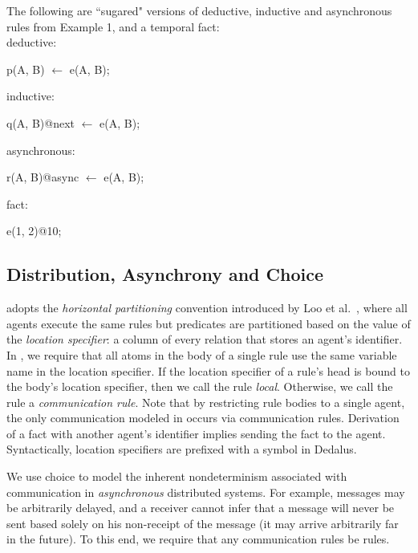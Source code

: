 \begin{example}
The following are ``sugared" versions of deductive, inductive and asynchronous rules from Example 1, and a temporal fact:
\\
deductive:
\begin{Dedalus}
p(A, B) \(\leftarrow\) e(A, B);
\end{Dedalus}
inductive:
\begin{Dedalus}
q(A, B)@next \(\leftarrow\) e(A, B);
\end{Dedalus}
asynchronous:
\begin{Dedalus}
r(A, B)@async \(\leftarrow\) e(A, B);
\end{Dedalus}
fact:
\begin{Dedalus}
e(1, 2)@10;
\end{Dedalus}

\end{example}

\subsection{Distribution, Asynchrony and Choice}

\lang adopts the {\em horizontal partitioning} convention introduced by Loo et
al.~\cite{Loo:2005}, where all agents execute the same rules but predicates are
partitioned based on the value of the {\em location specifier}: a column of
every relation that stores an agent's identifier. In \lang, we require that all
atoms in the body of a single rule use the same variable name in the location
specifier. If the location specifier of a rule's head is bound to the body's
location specifier, then we call the rule {\em local}.  Otherwise, we call the
rule a {\em communication rule}.  Note that by restricting rule bodies to a
single agent, the only communication modeled in \lang occurs via communication
rules.  Derivation of a fact with another agent's identifier implies sending
the fact to the agent.  Syntactically, location specifiers are prefixed with a
\dedalus{\#} symbol in Dedalus.

We use choice to model the inherent nondeterminism associated with
communication in {\em asynchronous} distributed systems.  For example, messages
may be arbitrarily delayed, and a receiver cannot infer that a message will
never be sent based solely on his non-receipt of the message (it may arrive
arbitrarily far in the future).
To this end, we require that any communication rules be  rules.

